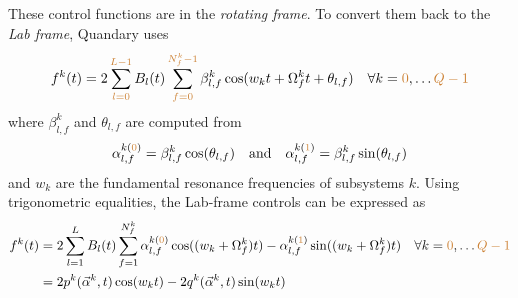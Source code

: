 \documentclass[letterpaper]{article}
\newcommand{\YC}[1]{{\textcolor{Bronze}{#1}}}
\begin{document}
These control functions are in the \textit{rotating frame}. To convert them back
to the \textit{Lab frame}, Quandary uses
\begin{align}
  f^k(t) = 2 \sum_{\YC{l=0}}^\YC{L-1} B_l(t) \sum_{\YC{f=0}}^{\YC{N_f^k-1}} \beta_{l,f}^k \cos(w_k t +
  \Omega_f^k t + \theta_{l,f}) \quad \forall k=\YC{0},\dots \YC{Q-1}
\end{align}
where $\beta_{l,f}^k$ and $\theta_{l,f}$ are computed from
\begin{align}
  \alpha_{l,f}^{k(\YC{0})} = \beta_{l,f}^k \cos(\theta_{l,f}) \quad \text{and} \quad
  \alpha_{l,f}^{k(\YC{1})} = \beta_{l,f}^k \sin(\theta_{l,f})
\end{align}
and $w_k$ are the fundamental resonance frequencies of subsystems $k$. Using
\YC{trigonometric} equalities, the Lab-frame co\YC{n}trols can be expressed as
\begin{align}
  f^k(t) &= 2 \sum_{l=1}^L B_l(t) \sum_{f=1}^{N_f^k} \alpha_{l,f}^{k(\YC{0})} \cos((w_k
  + \Omega_f^k) t) - \alpha_{l,f}^{k(\YC{1})}\sin((w_k + \Omega_f^k) t) \quad \forall
  k=\YC{0},\dots \YC{Q-1} \\
         &= 2 p^k(\vec{\alpha}^k, t) \cos(w_k t) - 2 q^k(\vec{\alpha}^k,
         t)\sin(w_k t) \\
\end{align}
\end{document}
